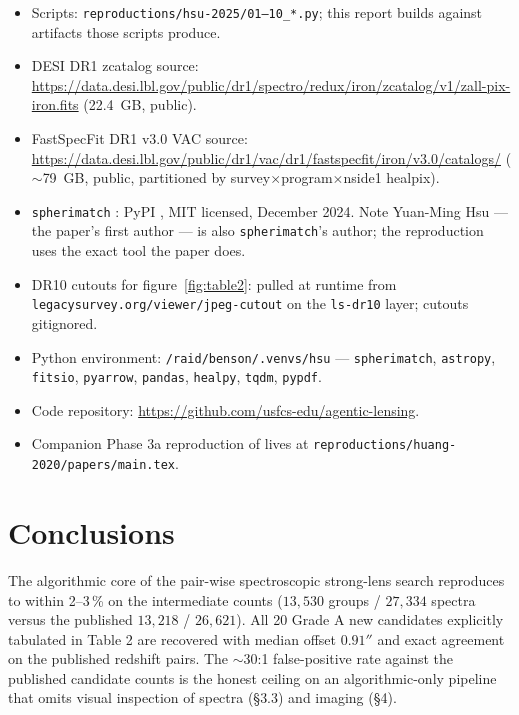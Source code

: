 \documentclass[11pt,letterpaper]{article}
\begin{document}
\begin{itemize}
\item Scripts: \texttt{reproductions/hsu-2025/01--10\_*.py}; this
      report builds against artifacts those scripts produce.
\item DESI DR1 zcatalog source:
      \url{https://data.desi.lbl.gov/public/dr1/spectro/redux/iron/zcatalog/v1/zall-pix-iron.fits}
      (22.4~GB, public).
\item FastSpecFit DR1 v3.0 VAC source:
      \url{https://data.desi.lbl.gov/public/dr1/vac/dr1/fastspecfit/iron/v3.0/catalogs/}
      ($\sim$79~GB, public, partitioned by survey$\times$program$\times$nside1 healpix).
\item \texttt{spherimatch} \autocite{spherimatch}: PyPI
      , MIT licensed, December 2024.
      Note Yuan-Ming Hsu — the paper's first author — is also
      \texttt{spherimatch}'s author; the reproduction uses the exact
      tool the paper does.
\item DR10 cutouts for figure~\ref{fig:table2}: pulled at runtime from
      \texttt{legacysurvey.org/viewer/jpeg-cutout} on the \texttt{ls-dr10}
      layer; cutouts gitignored.
\item Python environment: \texttt{/raid/benson/.venvs/hsu} —
      \texttt{spherimatch}, \texttt{astropy}, \texttt{fitsio},
      \texttt{pyarrow}, \texttt{pandas}, \texttt{healpy}, \texttt{tqdm},
      \texttt{pypdf}.
\item Code repository: \url{https://github.com/usfcs-edu/agentic-lensing}.
\item Companion Phase 3a reproduction of \citet{huang2020decals} lives
      at \texttt{reproductions/huang-2020/papers/main.tex}.
\end{itemize}

\section{Conclusions}

The algorithmic core of the \citet{hsu2025pairwise} pair-wise
spectroscopic strong-lens search reproduces to within 2--3\,\% on the
intermediate counts ($13{,}530$ groups / $27{,}334$ spectra versus the
published $13{,}218$ / $26{,}621$). All 20 Grade A new candidates
explicitly tabulated in \citet{hsu2025pairwise} Table 2 are recovered
with median offset $0.91''$ and exact agreement on the published
redshift pairs. The $\sim$30:1 false-positive rate against the
published candidate counts is the honest ceiling on an algorithmic-only
pipeline that omits visual inspection of spectra (\S3.3) and imaging
(\S4).
\end{document}
